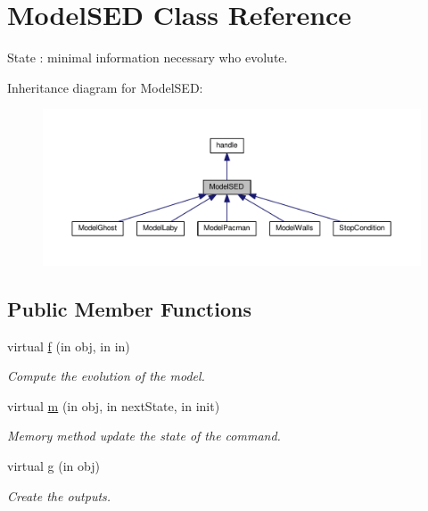 \hypertarget{class_model_s_e_d}{}\section{Model\+S\+ED Class Reference}
\label{class_model_s_e_d}


State \+: minimal information necessary who evolute.  




Inheritance diagram for Model\+S\+ED\+:
\nopagebreak
\begin{figure}[H]
\begin{center}
\leavevmode
\includegraphics[width=350pt]{class_model_s_e_d__inherit__graph}
\end{center}
\end{figure}
\subsection*{Public Member Functions}
\begin{DoxyCompactItemize}
\item 
virtual \hyperlink{class_model_s_e_d_ac36f9451c43b120828af4380858f2024}{f} (in obj, in in)
\begin{DoxyCompactList}\small\item\em Compute the evolution of the model. \end{DoxyCompactList}\item 
virtual \hyperlink{class_model_s_e_d_adb8aaccb857cf5bbec640cd00915459d}{m} (in obj, in next\+State, in init)
\begin{DoxyCompactList}\small\item\em Memory method update the state of the command. \end{DoxyCompactList}\item 
virtual \hyperlink{class_model_s_e_d_ac6bf71081e35755d5ed9992d165afcb8}{g} (in obj)
\begin{DoxyCompactList}\small\item\em Create the outputs. \end{DoxyCompactList}\end{DoxyCompactItemize}
